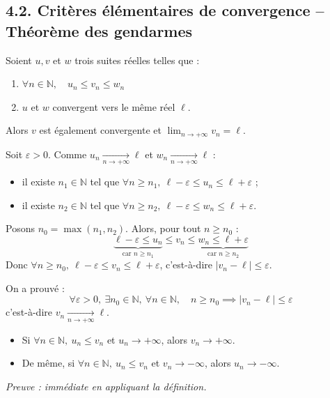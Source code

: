 \documentclass[a4paper,11pt]{article}
\newcommand{\N}{\mathbb{N}}
\begin{document}
\newpage
\subsection{4.2. Critères élémentaires de convergence -- Théorème des gendarmes}

\begin{theoreme}
Soient $u, v$ et $w$ trois suites réelles telles que :
\begin{enumerate}
    \item $\forall n \in \N, \quad u_n \le v_n \le w_n$
    \item $u$ et $w$ convergent vers le même réel $\ell$.
\end{enumerate}
Alors $v$ est également convergente et $\displaystyle\lim_{n \to +\infty} v_n = \ell$.
\end{theoreme}

\begin{demonstration}
Soit $\varepsilon > 0$. Comme $u_n \xrightarrow[n \to +\infty]{} \ell$ et $w_n \xrightarrow[n \to +\infty]{} \ell$ :
\begin{itemize}
    \item il existe $n_1 \in \N$ tel que $\forall n \ge n_1, \ \ell - \varepsilon \le u_n \le \ell + \varepsilon$ ;
    \item il existe $n_2 \in \N$ tel que $\forall n \ge n_2, \ \ell - \varepsilon \le w_n \le \ell + \varepsilon$.
\end{itemize}
Posons $n_0 = \max(n_1, n_2)$. Alors, pour tout $n \ge n_0$ :
\[
\underbrace{\ell - \varepsilon \le u_n}_{\text{car } n \ge n_1} \le v_n \le \underbrace{w_n \le \ell + \varepsilon}_{\text{car } n \ge n_2}
\]
Donc $\forall n \ge n_0, \ \ell - \varepsilon \le v_n \le \ell + \varepsilon$, c'est-à-dire $|v_n - \ell| \le \varepsilon$.

On a prouvé :
\[
\forall \varepsilon > 0, \ \exists n_0 \in \N, \ \forall n \in \N, \quad n \ge n_0 \implies |v_n - \ell| \le \varepsilon
\]
c'est-à-dire $v_n \xrightarrow[n \to +\infty]{} \ell$.
\end{demonstration}

\begin{remarque}
\begin{itemize}
    \item Si $\forall n \in \N, \ u_n \le v_n$ et $u_n \to +\infty$, alors $v_n \to +\infty$.
    \item De même, si $\forall n \in \N, \ u_n \le v_n$ et $v_n \to -\infty$, alors $u_n \to -\infty$.
\end{itemize}
\textit{Preuve : immédiate en appliquant la définition.}
\end{remarque}
\end{document}
